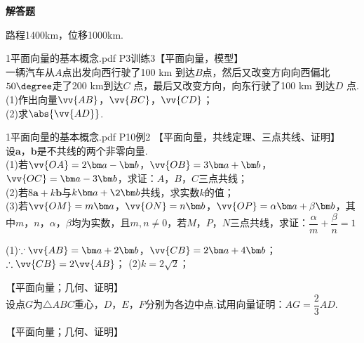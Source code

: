 \begin{exercise}{\bf 解答题}
      \begin{answer}
        路程1400km，位移1000km.
      \end{answer}
    \item 1平面向量的基本概念.pdf P3训练3【平面向量，模型】\\
      一辆汽车从$A $点出发向西行驶了100 km 到达$B $点，然后又改变方向向西偏北$50\degree$走了200 km到达$C$ 点，最后又改变方向，向东行驶了100 km 到达$D$ 点.\\
      (1)作出向量$\vv{AB}$，$\vv{BC}$，$\vv{CD}$；\\
      (2)求$\abs{\vv{AD}}$.
    \item 1平面向量的基本概念.pdf P10例2 【平面向量，共线定理、三点共线、证明】\\
      设$\bm a$，$\bm b$是不共线的两个非零向量.\\
      (1)若$\vv{OA}=2\bm a-\bm b$，$\vv{OB}=3\bm a+\bm b$，$\vv{OC}=\bm a-3\bm b$，求证：$A$，$B$，$C$三点共线；\\
      (2)若$8\bm a+k\bm b$与$k\bm a+\2\bm b$共线，求实数$k$的值；\\
      (3)若$\vv{OM}=m\bm a$，$\vv{ON}=n\bm b$，$\vv{OP}=\alpha\bm a+\beta\bm b$，其中$m$，$n$，$\alpha$，$\beta$均为实数，且$m,n\neq 0$，若$M$，$P$，$N$三点共线，求证：$\dfrac{\alpha}m+\dfrac{\beta}n=1$
      \begin{answer}
        (1)$\because \vv{AB}=\bm a+2\bm b$，$\vv{CB}=2\bm a+4\bm b$；$\therefore \vv{CB}=2\vv{AB}$；
        (2)$k=2\sqrt2$；
      \end{answer}
    \item 【平面向量；几何、证明】\\
      设点$G$为$\triangle ABC$重心，$D$，$E$，$F$分别为各边中点.试用向量证明：$AG=\dfrac23 AD$.
      \begin{flushright}
      \end{flushright}
    \item 【平面向量；几何、证明】\\

\end{exercise}
